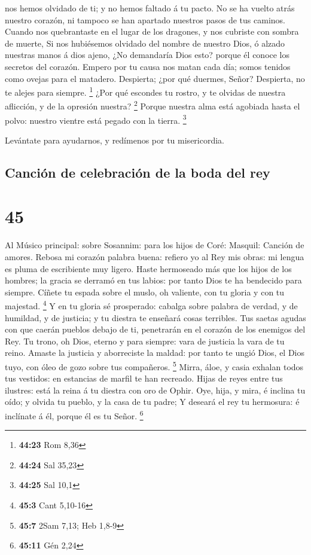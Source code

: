 nos hemos olvidado de ti; y no hemos faltado á tu pacto. 
No se ha vuelto atrás nuestro corazón, ni tampoco se han apartado
nuestros pasos de tus caminos.  Cuando nos quebrantaste en
el lugar de los dragones, y nos cubriste con sombra de muerte,
 Si nos hubiésemos olvidado del nombre de nuestro Dios, ó
alzado nuestras manos á dios ajeno,  ¿No demandaría Dios
esto? porque él conoce los secretos del corazón.  Empero
por tu causa nos matan cada día; somos tenidos como ovejas para el
matadero.  Despierta; ¿por qué duermes, Señor? Despierta,
no te alejes para siempre. \footnote{\textbf{44:23} Rom 8,36}
 ¿Por qué escondes tu rostro, y te olvidas de nuestra
aflicción, y de la opresión nuestra? \footnote{\textbf{44:24} Sal 35,23}
 Porque nuestra alma está agobiada hasta el polvo: nuestro
vientre está pegado con la tierra. \footnote{\textbf{44:25} Sal 10,1}

 Levántate para ayudarnos, y redímenos por tu misericordia.

\hypertarget{canciuxf3n-de-celebraciuxf3n-de-la-boda-del-rey}{%
\subsection{Canción de celebración de la boda del
rey}\label{canciuxf3n-de-celebraciuxf3n-de-la-boda-del-rey}}

\hypertarget{section-44}{%
\section{45}\label{section-44}}

 Al Músico principal: sobre Sosannim: para los hijos de
Coré: Masquil: Canción de amores. Rebosa mi corazón palabra buena:
refiero yo al Rey mis obras: mi lengua es pluma de escribiente muy
ligero.  Haste hermoseado más que los hijos de los hombres;
la gracia se derramó en tus labios: por tanto Dios te ha bendecido para
siempre.  Cíñete tu espada sobre el muslo, oh valiente, con
tu gloria y con tu majestad. \footnote{\textbf{45:3} Cant 5,10-16}
 Y en tu gloria sé prosperado: cabalga sobre palabra de
verdad, y de humildad, y de justicia; y tu diestra te enseñará cosas
terribles.  Tus saetas agudas con que caerán pueblos debajo
de ti, penetrarán en el corazón de los enemigos del Rey.  Tu
trono, oh Dios, eterno y para siempre: vara de justicia la vara de tu
reino.  Amaste la justicia y aborreciste la maldad: por
tanto te ungió Dios, el Dios tuyo, con óleo de gozo sobre tus
compañeros. \footnote{\textbf{45:7} 2Sam 7,13; Heb 1,8-9} 
Mirra, áloe, y casia exhalan todos tus vestidos: en estancias de marfil
te han recreado.  Hijas de reyes entre tus ilustres: está la
reina á tu diestra con oro de Ophir.  Oye, hija, y mira, é
inclina tu oído; y olvida tu pueblo, y la casa de tu padre;
 Y deseará el rey tu hermosura: é inclínate á él, porque él
es tu Señor. \footnote{\textbf{45:11} Gén 2,24}

